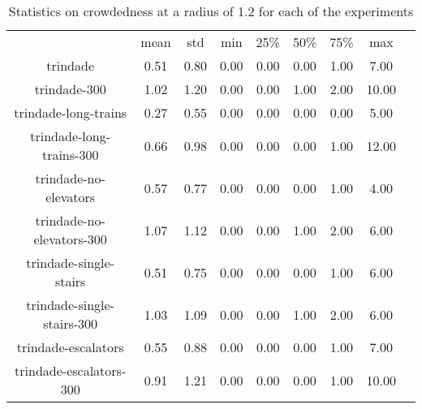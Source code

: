 \begin{table*}
    \begin{tabular}{|c|cccccccc|}
      & mean & std & min & 25\% & 50\% & 75\% & max \\
    trindade  & 0.51 & 0.80 & 0.00 & 0.00 & 0.00 & 1.00 & 7.00 \\
    trindade-300  & 1.02 & 1.20 & 0.00 & 0.00 & 1.00 & 2.00 & 10.00 \\
    trindade-long-trains  & 0.27 & 0.55 & 0.00 & 0.00 & 0.00 & 0.00 & 5.00 \\
    trindade-long-trains-300  & 0.66 & 0.98 & 0.00 & 0.00 & 0.00 & 1.00 & 12.00 \\
    trindade-no-elevators  & 0.57 & 0.77 & 0.00 & 0.00 & 0.00 & 1.00 & 4.00 \\
    trindade-no-elevators-300  & 1.07 & 1.12 & 0.00 & 0.00 & 1.00 & 2.00 & 6.00 \\
    trindade-single-stairs  & 0.51 & 0.75 & 0.00 & 0.00 & 0.00 & 1.00 & 6.00 \\
    trindade-single-stairs-300  & 1.03 & 1.09 & 0.00 & 0.00 & 1.00 & 2.00 & 6.00 \\
    trindade-escalators  & 0.55 & 0.88 & 0.00 & 0.00 & 0.00 & 1.00 & 7.00 \\
    trindade-escalators-300  & 0.91 & 1.21 & 0.00 & 0.00 & 0.00 & 1.00 & 10.00 \\
    \end{tabular}
\caption{Statistics on crowdedness at a radius of 1.2 for each of the experiments}
\label{annex:crowdedness_1.2}

\end{table*}

